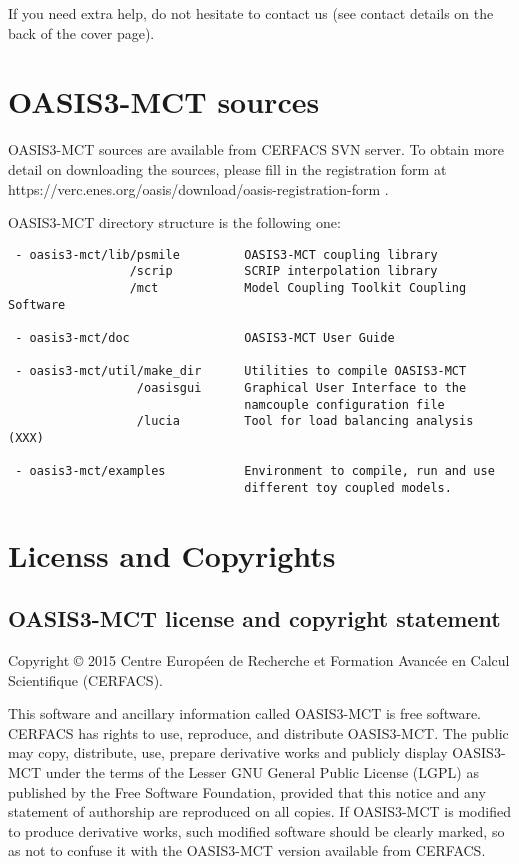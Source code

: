 If you need extra help, do not hesitate to contact us (see contact
details on the back of the cover page).

\section{OASIS3-MCT sources}
\label{sec_Obtaining}
OASIS3-MCT sources are available from CERFACS SVN server. To obtain more detail on downloading
the sources, please fill in the registration form at
https://verc.enes.org/oasis/download/oasis-registration-form .

OASIS3-MCT directory structure is the following one:

\begin{verbatim}
 - oasis3-mct/lib/psmile         OASIS3-MCT coupling library
                 /scrip          SCRIP interpolation library
                 /mct            Model Coupling Toolkit Coupling Software
                  
 - oasis3-mct/doc                OASIS3-MCT User Guide

 - oasis3-mct/util/make_dir      Utilities to compile OASIS3-MCT
                  /oasisgui      Graphical User Interface to the
                                 namcouple configuration file
                  /lucia         Tool for load balancing analysis (XXX)

 - oasis3-mct/examples           Environment to compile, run and use
                                 different toy coupled models. 
\end{verbatim}
\newpage
\section{Licenss and Copyrights}
 
\subsection{OASIS3-MCT license and copyright statement}

Copyright © 2015 Centre Europ\'een de Recherche et Formation
Avanc\'ee en Calcul Scientifique (CERFACS).  

This software and ancillary information called OASIS3-MCT is free
software.  CERFACS has rights to use, reproduce, and distribute
OASIS3-MCT. The public may copy, distribute, use, prepare derivative works and
publicly display OASIS3-MCT under the terms of the Lesser GNU General
Public License (LGPL) as published by the Free Software Foundation,
provided that this notice and any statement of authorship are
reproduced on all copies. If OASIS3-MCT is modified to produce derivative
works, such modified software should be clearly marked, so as not to
confuse it with the OASIS3-MCT version available from CERFACS.

